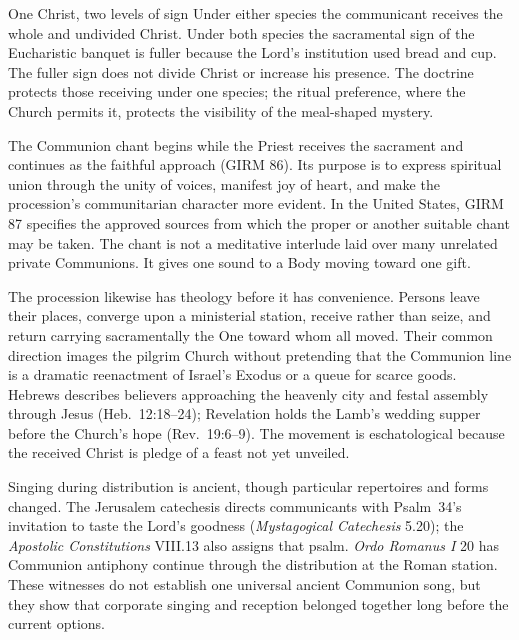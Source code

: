 \begin{studybox}{One Christ, two levels of sign}
Under either species the communicant receives the whole and undivided Christ. Under both species the sacramental sign of the Eucharistic banquet is fuller because the Lord's institution used bread and cup. The fuller sign does not divide Christ or increase his presence. The doctrine protects those receiving under one species; the ritual preference, where the Church permits it, protects the visibility of the meal-shaped mystery.
\end{studybox}


The Communion chant begins while the Priest receives the sacrament and continues as the faithful approach (GIRM 86). Its purpose is to express spiritual union through the unity of voices, manifest joy of heart, and make the procession's communitarian character more evident. In the United States, GIRM 87 specifies the approved sources from which the proper or another suitable chant may be taken. The chant is not a meditative interlude laid over many unrelated private Communions. It gives one sound to a Body moving toward one gift.

The procession likewise has theology before it has convenience. Persons leave their places, converge upon a ministerial station, receive rather than seize, and return carrying sacramentally the One toward whom all moved. Their common direction images the pilgrim Church without pretending that the Communion line is a dramatic reenactment of Israel's Exodus or a queue for scarce goods. Hebrews describes believers approaching the heavenly city and festal assembly through Jesus (Heb.~12:18--24); Revelation holds the Lamb's wedding supper before the Church's hope (Rev.~19:6--9). The movement is eschatological because the received Christ is pledge of a feast not yet unveiled.

Singing during distribution is ancient, though particular repertoires and forms changed. The Jerusalem catechesis directs communicants with Psalm~34's invitation to taste the Lord's goodness (\emph{Mystagogical Catechesis} 5.20); the \emph{Apostolic Constitutions} VIII.13 also assigns that psalm. \emph{Ordo Romanus I} 20 has Communion antiphony continue through the distribution at the Roman station. These witnesses do not establish one universal ancient Communion song, but they show that corporate singing and reception belonged together long before the current options.

